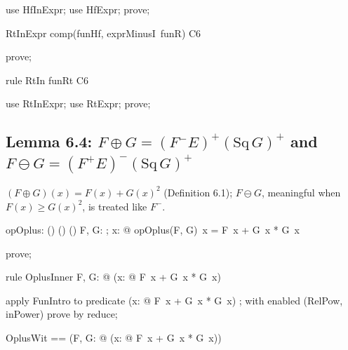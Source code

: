 \documentclass{article}
\begin{document}
\begin{zproof}
use HfInExpr;
use HfExpr;
prove;
\end{zproof}
\begin{theorem}{RtInExpr}
  comp(funHf, exprMinusI~funR) \in C6
\end{theorem}

\begin{zproof}
prove;
\end{zproof}

\begin{theorem}{rule RtIn}
  funRt \in C6
\end{theorem}

\begin{zproof}
use RtInExpr;
use RtExpr;
prove;
\end{zproof}

\subsection{Lemma 6.4: $F \oplus G = (F^- E)^+ (\mathrm{Sq}\,G)^+$ and $F \ominus G = (F^+ E)^- (\mathrm{Sq}\,G)^+$}

$(F \oplus G)(x) = F(x) + G(x)^2$ (Definition 6.1); $F \ominus G$, meaningful when $F(x) \ge G(x)^2$, is treated like $F^-$.

\begin{axdef}
  opOplus: (\nat \fun \nat) \cross (\nat \fun \nat) \fun (\nat \fun \nat)
\where
   \forall F, G: \nat \fun \nat; x: \nat @ opOplus(F, G)~x = F~x + G~x * G~x
\end{axdef}

\begin{zproof}
prove;
\end{zproof}

\begin{theorem}{rule OplusInner}
  \forall F, G: \nat \fun \nat @ (\lambda x: \nat @ F~x + G~x * G~x) \in \nat \fun \nat
\end{theorem}

\begin{zproof}
apply FunIntro to predicate (\lambda x: \nat @ F~x + G~x * G~x) \in \nat \fun \nat;
with enabled (RelPow, inPower) prove by reduce;
\end{zproof}

\begin{zed}
  OplusWit == (\lambda F, G: \nat \fun \nat @ (\lambda x: \nat @ F~x + G~x * G~x))
\end{zed}
\end{document}
